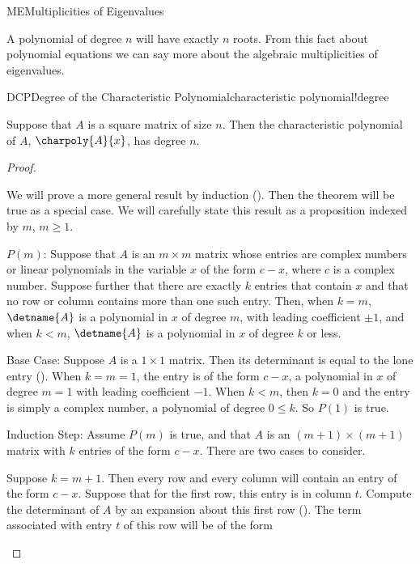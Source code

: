 \begin{subsect}{ME}{Multiplicities of Eigenvalues}
%
\begin{para}A polynomial of degree $n$ will have exactly $n$ roots.  From this fact about polynomial equations we can say more about the algebraic multiplicities of eigenvalues.\end{para}
%
\begin{theorem}{DCP}{Degree of the Characteristic Polynomial}{characteristic polynomial!degree}
\begin{para}Suppose that $A$ is a square matrix of size $n$.  Then the characteristic polynomial of $A$, $\charpoly{A}{x}$, has degree $n$.\end{para}
\end{theorem}
%
\begin{proof}
\begin{para}We will prove a more general result by induction ().  Then the theorem will be true as a special case.  We will carefully state this result as a proposition indexed by $m$, $m\geq 1$.\end{para}
%
\begin{para}$P(m)$:  Suppose that $A$ is an $m\times m$ matrix whose entries are complex numbers or linear polynomials in the variable $x$ of the form $c-x$, where $c$ is a complex number.  Suppose further that there are exactly $k$ entries that contain $x$ and that no row or column contains more than one such entry.  Then, when $k=m$, $\detname{A}$ is a polynomial in $x$ of degree $m$, with leading coefficient $\pm 1$,
and when $k<m$,
$\detname{A}$ is a polynomial in $x$ of degree $k$ or less.\end{para}
%
\begin{para}Base Case:  Suppose $A$ is a $1\times 1$ matrix.  Then its determinant is equal to the lone entry ().  When $k=m=1$, the entry is of the form $c-x$, a polynomial in $x$ of degree $m=1$ with leading coefficient $-1$.
When $k<m$,
then $k=0$ and the entry is simply a complex number, a polynomial of degree $0\leq k$.  So $P(1)$ is true.\end{para}
%
\begin{para}Induction Step: Assume $P(m)$ is true, and that $A$ is an $(m+1)\times(m+1)$ matrix with $k$ entries of the form $c-x$.  There are two cases to consider.\end{para}
%
\begin{para}Suppose $k=m+1$.  Then every row and every column will contain an entry of the form $c-x$.  Suppose that for the first row, this entry is in column $t$.  Compute the determinant of $A$ by an expansion about this first row ().  The term associated with entry $t$ of this row will be of the form

\end{para}
\end{proof}
\end{subsect}
